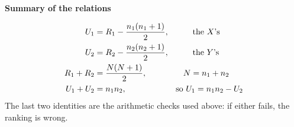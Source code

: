 \documentclass[11pt,a4paper]{article}
\theoremstyle{definition}
\begin{document}
\begin{center}
\textbf{Summary of the relations}
\end{center}
\begin{align*}
U_1 &=R_1-\frac{n_1(n_1+1)}{2}, \hspace{1cm}\text{the } X\text{'s}\\
U_2 &=R_2-\frac{n_2(n_2+1)}{2}, \hspace{1cm}\text{the } Y\text{'s}\\
R_1+R_2 &=\frac{N(N+1)}{2}, \hspace{1.55cm} N=n_1+n_2\\
U_1+U_2 &=n_1n_2, \hspace{2.1cm}\text{so } U_1=n_1n_2-U_2
\end{align*}
The last two identities are the arithmetic checks used above: if either fails, the
ranking is wrong.
\end{document}
